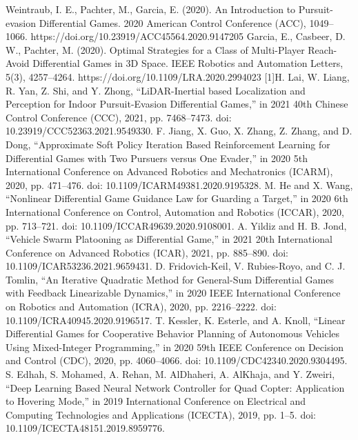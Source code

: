 \documentclass[conference]{IEEEtran}
\begin{document}

\begin{thebibliography}{00}
 Weintraub, I. E., Pachter, M., Garcia, E. (2020). An Introduction to Pursuit-evasion Differential Games. 2020 American Control Conference (ACC), 1049–1066. https://doi.org/10.23919/ACC45564.2020.9147205
 Garcia, E., Casbeer, D. W., Pachter, M. (2020). Optimal Strategies for a Class of Multi-Player Reach-Avoid Differential Games in 3D Space. IEEE Robotics and Automation Letters, 5(3), 4257–4264. https://doi.org/10.1109/LRA.2020.2994023
 [1]H. Lai, W. Liang, R. Yan, Z. Shi, and Y. Zhong, “LiDAR-Inertial based Localization and Perception for Indoor Pursuit-Evasion Differential Games,” in 2021 40th Chinese Control Conference (CCC), 2021, pp. 7468–7473. doi: 10.23919/CCC52363.2021.9549330.
 F. Jiang, X. Guo, X. Zhang, Z. Zhang, and D. Dong, “Approximate Soft Policy Iteration Based Reinforcement Learning for Differential Games with Two Pursuers versus One Evader,” in 2020 5th International Conference on Advanced Robotics and Mechatronics (ICARM), 2020, pp. 471–476. doi: 10.1109/ICARM49381.2020.9195328.
 M. He and X. Wang, “Nonlinear Differential Game Guidance Law for Guarding a Target,” in 2020 6th International Conference on Control, Automation and Robotics (ICCAR), 2020, pp. 713–721. doi: 10.1109/ICCAR49639.2020.9108001.
 A. Yildiz and H. B. Jond, “Vehicle Swarm Platooning as Differential Game,” in 2021 20th International Conference on Advanced Robotics (ICAR), 2021, pp. 885–890. doi: 10.1109/ICAR53236.2021.9659431.
 D. Fridovich-Keil, V. Rubies-Royo, and C. J. Tomlin, “An Iterative Quadratic Method for General-Sum Differential Games with Feedback Linearizable Dynamics,” in 2020 IEEE International Conference on Robotics and Automation (ICRA), 2020, pp. 2216–2222. doi: 10.1109/ICRA40945.2020.9196517.
 T. Kessler, K. Esterle, and A. Knoll, “Linear Differential Games for Cooperative Behavior Planning of Autonomous Vehicles Using Mixed-Integer Programming,” in 2020 59th IEEE Conference on Decision and Control (CDC), 2020, pp. 4060–4066. doi: 10.1109/CDC42340.2020.9304495.
 S. Edhah, S. Mohamed, A. Rehan, M. AlDhaheri, A. AlKhaja, and Y. Zweiri, “Deep Learning Based Neural Network Controller for Quad Copter: Application to Hovering Mode,” in 2019 International Conference on Electrical and Computing Technologies and Applications (ICECTA), 2019, pp. 1–5. doi: 10.1109/ICECTA48151.2019.8959776.

\end{thebibliography}
\end{document}
